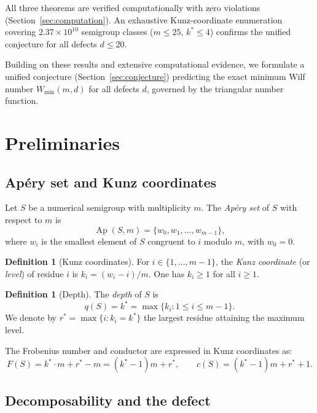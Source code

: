 \documentclass[11pt]{amsart}
\theoremstyle{definition}
\newtheorem{definition}[theorem]{Definition}
\theoremstyle{remark}
\newcommand{\Ap}{\operatorname{Ap}}
\begin{document}
All three theorems are verified computationally with zero violations
(Section~\ref{sec:computation}).  An exhaustive Kunz-coordinate enumeration
covering $2.37 \times 10^{10}$ semigroup classes ($m \le 25$, $k^* \le 4$)
confirms the unified conjecture for all defects $d \le 20$.

Building on these results and extensive computational evidence, we formulate a
unified conjecture (Section~\ref{sec:conjecture}) predicting the exact minimum
Wilf number $W_{\min}(m, d)$ for all defects $d$,
governed by the triangular number function.

\section{Preliminaries}\label{sec:prelim}

\subsection{Ap\'ery set and Kunz coordinates}

Let $S$ be a numerical semigroup with multiplicity $m$.
The \emph{Ap\'ery set} of $S$ with respect to $m$ is
\[
  \Ap(S, m) = \{w_0, w_1, \ldots, w_{m-1}\},
\]
where $w_i$ is the smallest element of $S$ congruent to $i$ modulo $m$,
with $w_0 = 0$.

\begin{definition}[Kunz coordinates]\label{def:kunz}
For $i \in \{1, \ldots, m-1\}$, the \emph{Kunz coordinate} (or \emph{level})
of residue $i$ is $k_i = (w_i - i) / m$.  One has $k_i \ge 1$ for all $i \ge 1$.
\end{definition}

\begin{definition}[Depth]\label{def:depth}
The \emph{depth} of $S$ is
\[
  q(S) = k^* = \max\{k_i : 1 \le i \le m - 1\}.
\]
We denote by $r^* = \max\{i : k_i = k^*\}$ the largest residue attaining the
maximum level.
\end{definition}

The Frobenius number and conductor are expressed in Kunz coordinates as:
\begin{equation}\label{eq:conductor}
  F(S) = k^* \cdot m + r^* - m = (k^* - 1)m + r^*, \qquad
  c(S) = (k^* - 1)m + r^* + 1.
\end{equation}

\subsection{Decomposability and the defect}
\end{document}
